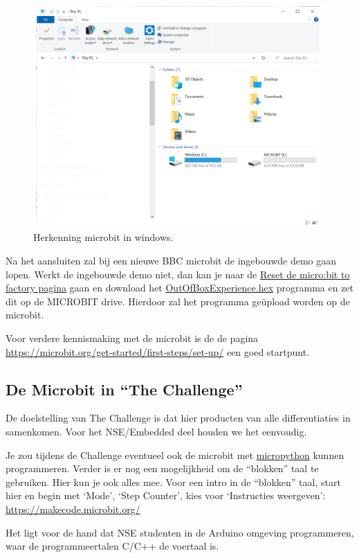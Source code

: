 \begin{figure}[h!]
	\captionsetup{justification=centering}
	\includegraphics[width=0.50 \linewidth]{figuren/driverLetter}
	\centering
	\caption{Herkenning microbit in windows.}
	\label{fig:driveL}
\end{figure}

Na het aansluiten zal bij een nieuwe BBC microbit de ingebouwde demo gaan lopen. Werkt de ingebouwde demo niet, dan kan je naar de \href{https://support.microbit.org/support/solutions/articles/19000021613-reset-the-micro-bit-to-factory-defaults}{Reset de micro:bit to factory pagina} gaan en download het  \href{https://support.microbit.org/helpdesk/attachments/19067609189} {OutOfBoxExperience.hex} programma en zet dit op de MICROBIT drive. Hierdoor zal het programma geüpload worden op de microbit.

Voor verdere kennismaking met de microbit is de de pagina \href{https://microbit.org/get-started/first-steps/set-up/}{https://microbit.org/get-started/first-steps/set-up/}
een goed startpunt.


\subsection{De Microbit in “The Challenge”}

De doelstelling van The Challenge is dat hier producten van alle differentiaties in samenkomen. Voor het NSE/Embedded deel houden we het eenvoudig.


Je zou tijdens de Challenge eventueel ook de microbit met \href{https://docs.arduino.cc/micropython/?_gl=1*bbja8p*_gcl_au*MTA0MzMyMzUwNC4xNzI4NDYwNDQ0*FPAU*MTA0MzMyMzUwNC4xNzI4NDYwNDQ0*_ga*MTM2NDc5NzM2OC4xNzI4NDYwNDQy*_ga_NEXN8H46L5*MTcyODQ2MDQ0MS4xLjEuMTcyODQ2MDQ5MS4wLjAuMTk3NzAxMDU1NQ..*_fplc*dmdpUTJCaSUyQjFINjd2SExxV092Zml5Ym92VlZQMGdtNWFSeG0lMkJLWEpQSnFDMkE4cG52M1klMkJGcGdNYzRKNGhBTkMzRXcyOXc0Ykhvcndmc0UyMVdwM1U2Rzc0bkFURWoxRHBWN3RlbjNvMlRNOVJ0eW1nSmp3OXFucURhWW9BJTNEJTNE}{micropython} kunnen programmeren.
Verder is er nog een mogelijkheid om de “blokken” taal te gebruiken. Hier kun je ook alles mee.
Voor een intro in de “blokken” taal, start hier en begin met ‘Mode’, ‘Step Counter’, kies voor ‘Instructies weergeven’: \href{https://makecode.microbit.org/}{https://makecode.microbit.org/}

Het ligt voor de hand dat NSE studenten in de Arduino omgeving programmeren, waar de programmeertalen C/C++ de voertaal is.\\